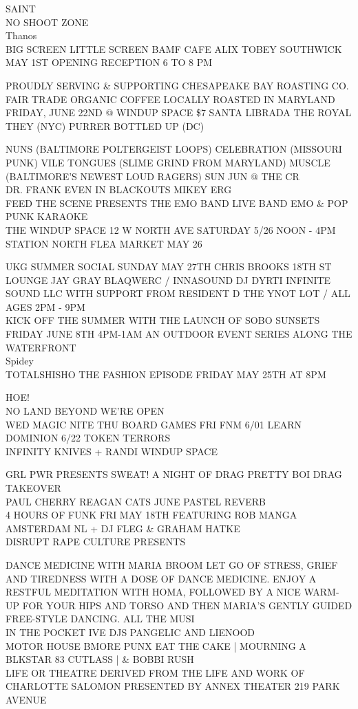\documentclass[10pt,letterpaper]{article}
\begin{document}
SAINT\\
NO SHOOT ZONE\\
Thanos\\
BIG SCREEN LITTLE SCREEN BAMF CAFE ALIX TOBEY SOUTHWICK MAY 1ST OPENING RECEPTION 6 TO 8 PM

PROUDLY SERVING \& SUPPORTING CHESAPEAKE BAY ROASTING CO. FAIR TRADE ORGANIC COFFEE LOCALLY ROASTED IN MARYLAND\\
FRIDAY, JUNE 22ND @ WINDUP SPACE \$7 SANTA LIBRADA THE ROYAL THEY (NYC) PURRER BOTTLED UP (DC)

NUNS (BALTIMORE POLTERGEIST LOOPS) CELEBRATION (MISSOURI PUNK) VILE TONGUES (SLIME GRIND FROM MARYLAND) MUSCLE (BALTIMORE'S NEWEST LOUD RAGERS) SUN JUN @ THE CR\\
DR. FRANK EVEN IN BLACKOUTS MIKEY ERG\\
FEED THE SCENE PRESENTS THE EMO BAND LIVE BAND EMO \& POP PUNK KARAOKE\\
THE WINDUP SPACE 12 W NORTH AVE SATURDAY 5/26 NOON {-} 4PM STATION NORTH FLEA MARKET MAY 26

UKG SUMMER SOCIAL SUNDAY MAY 27TH CHRIS BROOKS 18TH ST LOUNGE JAY GRAY BLAQWERC / INNASOUND DJ DYRTI INFINITE SOUND LLC WITH SUPPORT FROM RESIDENT D THE YNOT LOT / ALL AGES 2PM {-} 9PM\\
KICK OFF THE SUMMER WITH THE LAUNCH OF SOBO SUNSETS FRIDAY JUNE 8TH 4PM{-}1AM AN OUTDOOR EVENT SERIES ALONG THE WATERFRONT\\
Spidey\\
TOTALSHISHO THE FASHION EPISODE FRIDAY MAY 25TH AT 8PM

HOE!\\
NO LAND BEYOND WE'RE OPEN\\
WED MAGIC NITE THU BOARD GAMES FRI FNM 6/01 LEARN DOMINION 6/22 TOKEN TERRORS\\
INFINITY KNIVES + RANDI WINDUP SPACE

GRL PWR PRESENTS SWEAT!  A NIGHT OF DRAG PRETTY BOI DRAG TAKEOVER\\
PAUL CHERRY REAGAN CATS JUNE PASTEL REVERB\\
4 HOURS OF FUNK FRI MAY 18TH FEATURING ROB MANGA AMSTERDAM NL + DJ FLEG \& GRAHAM HATKE\\
DISRUPT RAPE CULTURE PRESENTS

DANCE MEDICINE WITH MARIA BROOM LET GO OF STRESS, GRIEF AND TIREDNESS WITH A DOSE OF DANCE MEDICINE.  ENJOY A RESTFUL MEDITATION WITH HOMA, FOLLOWED BY A NICE WARM{-}UP FOR YOUR HIPS AND TORSO AND THEN MARIA'S GENTLY GUIDED FREE{-}STYLE DANCING.  ALL THE MUSI\\
IN THE POCKET IVE DJS PANGELIC AND LIENOOD\\
MOTOR HOUSE BMORE PUNX EAT THE CAKE | MOURNING A BLKSTAR 83 CUTLASS |  \& BOBBI RUSH\\
LIFE OR THEATRE DERIVED FROM THE LIFE AND WORK OF CHARLOTTE SALOMON PRESENTED BY ANNEX THEATER 219 PARK AVENUE
\end{document}
